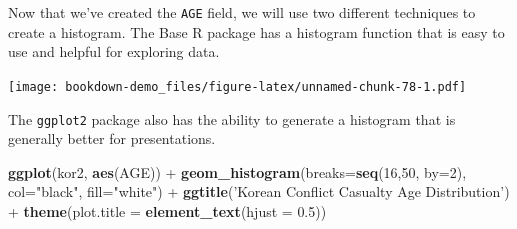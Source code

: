 \documentclass[]{book}
\newenvironment{Shaded}{\begin{snugshade}}{\end{snugshade}}
\newcommand{\KeywordTok}[1]{\textcolor[rgb]{0.13,0.29,0.53}{\textbf{{#1}}}}
\newcommand{\DataTypeTok}[1]{\textcolor[rgb]{0.13,0.29,0.53}{{#1}}}
\newcommand{\DecValTok}[1]{\textcolor[rgb]{0.00,0.00,0.81}{{#1}}}
\newcommand{\FloatTok}[1]{\textcolor[rgb]{0.00,0.00,0.81}{{#1}}}
\newcommand{\StringTok}[1]{\textcolor[rgb]{0.31,0.60,0.02}{{#1}}}
\newcommand{\CommentTok}[1]{\textcolor[rgb]{0.56,0.35,0.01}{\textit{{#1}}}}
\newcommand{\OtherTok}[1]{\textcolor[rgb]{0.56,0.35,0.01}{{#1}}}
\newcommand{\NormalTok}[1]{{#1}}
\begin{document}
\begin{Shaded}
\end{Shaded}

Now that we've created the \texttt{AGE} field, we will use two different
techniques to create a histogram. The Base R package has a histogram
function that is easy to use and helpful for exploring data.

\begin{Shaded}
\end{Shaded}

\texttt{[image: bookdown-demo\_files/figure-latex/unnamed-chunk-78-1.pdf]}

The \texttt{ggplot2} package also has the ability to generate a
histogram that is generally better for presentations.

\begin{Shaded}
\begin{Highlighting}[]
\KeywordTok{ggplot}\NormalTok{(kor2, }\KeywordTok{aes}\NormalTok{(AGE)) +}\StringTok{ }
\StringTok{  }\KeywordTok{geom_histogram}\NormalTok{(}\DataTypeTok{breaks=}\KeywordTok{seq}\NormalTok{(}\DecValTok{16}\NormalTok{,}\DecValTok{50}\NormalTok{, }\DataTypeTok{by=}\DecValTok{2}\NormalTok{), }\DataTypeTok{col=}\StringTok{"black"}\NormalTok{, }\DataTypeTok{fill=}\StringTok{"white"}\NormalTok{) +}\StringTok{ }
\StringTok{  }\KeywordTok{ggtitle}\NormalTok{(}\StringTok{'Korean Conflict Casualty Age Distribution'}\NormalTok{) +}\StringTok{ }
\StringTok{  }\KeywordTok{theme}\NormalTok{(}\DataTypeTok{plot.title =} \KeywordTok{element_text}\NormalTok{(}\DataTypeTok{hjust =} \FloatTok{0.5}\NormalTok{))}
\end{Highlighting}
\end{Shaded}
\end{document}
